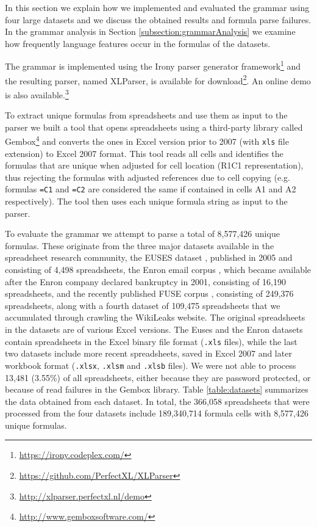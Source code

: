 \documentclass[times]{smrauth}
\begin{document}
In this section we explain how we implemented and evaluated the grammar using four large datasets and we discuss the obtained results and formula parse failures. In the grammar analysis in Section \ref{subsection:grammarAnalysis} we examine how frequently language features occur in the formulas of the datasets.

The grammar is implemented using the Irony parser generator framework\footnote{\url{https://irony.codeplex.com/}} and the resulting parser, named XLParser, is available for download\footnote{\url{https://github.com/PerfectXL/XLParser}}. An online demo is also available.\footnote{\url{http://xlparser.perfectxl.nl/demo}}

To extract unique formulas from spreadsheets and use them as input to the parser we built a tool that opens spreadsheets using a third-party library called Gembox\footnote{\url{http://www.gemboxsoftware.com/}} and converts the ones in Excel version prior to 2007 (with \texttt{xls} file extension) to Excel 2007 format. This tool reads all cells and identifies the formulas that are unique when adjusted for cell location (R1C1 representation), thus rejecting the formulas with adjusted references due to cell copying (e.g. formulas \texttt{=C1} and \texttt{=C2} are considered the same if contained in cells A1 and A2 respectively). The tool then uses each unique formula string as input to the parser.

To evaluate the grammar we attempt to parse a total of 8,577,426 unique formulas. These originate from the three major datasets available in the spreadsheet research community, the EUSES dataset \cite{euses}, published in 2005 and consisting of 4,498 spreadsheets, the Enron email corpus \cite{enron}, which became available after the Enron company declared bankruptcy in 2001, consisting of 16,190 spreadsheets, and the recently published FUSE corpus \cite{fuse}, consisting of 249,376 spreadsheets, along with a fourth dataset of 109,475 spreadsheets that we accumulated through crawling the WikiLeaks website. The original spreadsheets in the datasets are of various Excel versions. The Euses and the Enron datasets contain spreadsheets in the Excel binary file format (\texttt{.xls} files), while the last two datasets include more recent spreadsheets, saved in Excel 2007 and later workbook format (\texttt{.xlsx}, \texttt{.xlsm} and \texttt{.xlsb} files). We were not able to process 13,481 (3.55\%) of all spreadsheets, either because they are password protected, or because of read failures in the Gembox library. Table \ref{table:datasets} summarizes the data obtained from each dataset. In total, the 366,058 spreadsheets that were processed from the four datasets include 189,340,714 formula cells with 8,577,426 unique formulas.
\end{document}
